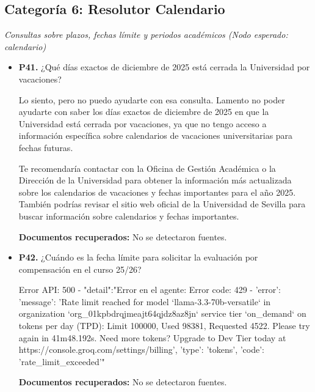 \documentclass{article}
\begin{document}
\subsection{Categoría 6: Resolutor Calendario}
\textit{Consultas sobre plazos, fechas límite y periodos académicos (Nodo esperado: calendario)}
\begin{itemize}
  \item \textbf{P41.} ¿Qué días exactos de diciembre de 2025 está cerrada la Universidad por vacaciones? \\
    \begin{respuesta_agente}
      Lo siento, pero no puedo ayudarte con esa consulta. Lamento no poder ayudarte con saber los días exactos de diciembre de 2025 en que la Universidad está cerrada por vacaciones, ya que no tengo acceso a información específica sobre calendarios de vacaciones universitarias para fechas futuras.

Te recomendaría contactar con la Oficina de Gestión Académica o la Dirección de la Universidad para obtener la información más actualizada sobre los calendarios de vacaciones y fechas importantes para el año 2025. También podrías revisar el sitio web oficial de la Universidad de Sevilla para buscar información sobre calendarios y fechas importantes.
    \end{respuesta_agente}
    \vspace{0.2cm}
    \noindent\textbf{Documentos recuperados:} No se detectaron fuentes.

  \item \textbf{P42.} ¿Cuándo es la fecha límite para solicitar la evaluación por compensación en el curso 25/26? \\
    \begin{respuesta_agente}
      Error API: 500 - {"detail":"Error en el agente: Error code: 429 - {'error': {'message': 'Rate limit reached for model `llama-3.3-70b-versatile` in organization `org_01kpbdrqjmeajt64qjdz8az8jn` service tier `on_demand` on tokens per day (TPD): Limit 100000, Used 98381, Requested 4522. Please try again in 41m48.192s. Need more tokens? Upgrade to Dev Tier today at https://console.groq.com/settings/billing', 'type': 'tokens', 'code': 'rate_limit_exceeded'}}"}
    \end{respuesta_agente}
    \vspace{0.2cm}
    \noindent\textbf{Documentos recuperados:} No se detectaron fuentes.


\end{itemize}
\end{document}
